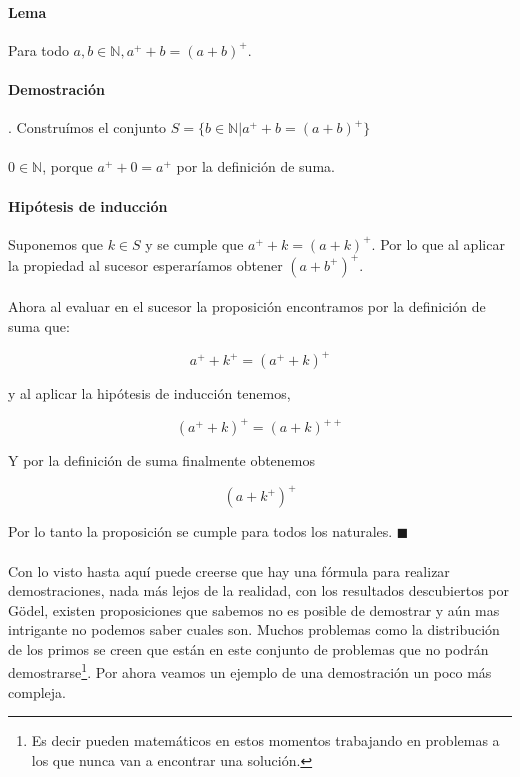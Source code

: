 \documentclass{article}
\begin{document}
\paragraph{Lema} Para todo $a,b \in \mathbb{N}, a^+ + b = (a + b)^+$.

\paragraph{Demostración}. Construímos el conjunto $S =  \{ b \in \mathbb{N}| a^+ + b = (a + b)^+ \}$

\paragraph{} $0 \in \mathbb{N}$, porque $a^+ + 0 = a^+$ por la definición de suma.

\paragraph{Hipótesis de inducción} Suponemos que $k \in S$ y se cumple que $a^+ + k = (a + k)^+$. Por lo que al aplicar la propiedad al sucesor esperaríamos obtener $(a + b^+)^+$.

\paragraph{}Ahora al evaluar en el sucesor la proposición encontramos por la definición de suma que:

$$ a^+ + k^+ = (a^+ + k)^+$$

y al aplicar la hipótesis de inducción tenemos,

$$(a^+ + k)^+ = (a + k)^{++}$$

Y por la definición de suma finalmente obtenemos

$$(a + k^+)^+$$

Por lo tanto la proposición se cumple para todos los naturales. $\blacksquare$

\paragraph{} Con lo visto hasta aquí puede creerse que hay una fórmula para realizar demostraciones, nada más lejos de la realidad, con los resultados descubiertos por Gödel, existen proposiciones que sabemos no es posible de demostrar y aún mas intrigante no podemos saber cuales son. Muchos problemas como la distribución de los primos se creen que están en este conjunto de problemas que no podrán demostrarse\footnote{Es decir pueden matemáticos en estos momentos trabajando en problemas a los que nunca van a encontrar una solución.}. Por ahora veamos un ejemplo de una demostración un poco más compleja.
\end{document}
